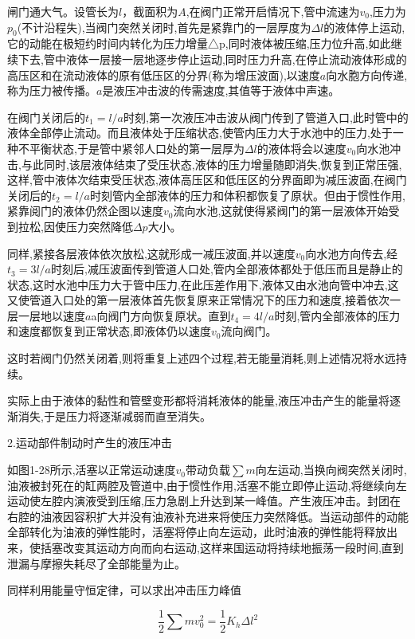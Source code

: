 

闸门通大气。设管长为$l$，截面积为$A$,在阀门正常开启情况下,管中流速为$v_0$,压力为$p_0$(不计沿程失),当阀门突然关闭时,首先是紧靠门的一层厚度为$\varDelta l$的液体停上运动,它的动能在极短约时间内转化为压力增量△p,同时液体被压缩,压力位升高,如此继续下去,管中液体一层接一层地逐步停止运动,同时压力升高,在停止流动液体形成的高压区和在流动液体的原有低压区的分界(称为增压波面),以速度$a$向水胞方向传递,称为压力被传播。$a$是液压冲击波的传需速度,其值等于液体中声速。

在阀门关闭后的$t_1=l/a$时刻,第一次液压冲击波从阀门传到了管道入口,此时管中的液体全部停止流动。而且液体处于压缩状态,使管内压力大于水池中的压力,处于一种不平衡状态,于是管中紧邻人口处的第一层厚为$\varDelta l$的液体将会以速度$v_0$向水池冲击,与此同时,该层液体结束了受压状态,液体的压力增量随即消失,恢复到正常压强,这样,管中液体次结束受压状态,液体高压区和低压区的分界面即为减压波面,在阀门关闭后的$t_2=l/a$时刻管内全部液体的压力和体积都恢复了原状。但由于惯性作用,紧靠阅门的液体仍然企图以速度$v_0$流向水池,这就使得紧阀门的第一层液体开始受到拉松,因使压力突然降低$\varDelta p$大小。

同样,紧接各层液体依次放松,这就形成一减压波面,并以速度$v_0$向水池方向传去,经$t_3=3l/a$时刻后,减压波面传到管道人口处,管内全部液体都处于低压而且是静止的状态,这时水池中压力大于管中压力,在此压差作用下,液体又由水池向管中冲去,这又使管道入口处的第一层液体首先恢复原来正常情况下的压力和速度,接着依次一层一层地以速度$a$a向阀门方向恢复原状。直到$t_4=4l/a$时刻,管内全部液体的压力和速度都恢复到正常状态,即液体仍以速度$v_0$流向阀门。

这时若阀门仍然关闭着,则将重复上述四个过程,若无能量消耗,则上述情况将水远持续。

实际上由于液体的黏性和管壁变形都将消耗液体的能量,液压冲击产生的能量将逐渐消失,于是压力将逐渐减弱而直至消失。

2.运动部件制动时产生的液压冲击

如图1-28所示,活塞以正常运动速度$v_0$带动负载$\sum{m}$向左运动,当换向阀突然关闭时,油液被封死在的缸两腔及管道中,由于惯性作用,活塞不能立即停止运动,将继续向左运动使左腔内演液受到压缩,压力急剧上升达到某一峰值。产生液压冲击。封团在右腔的油液因容积扩大并没有油液补充进来将使压力突然降低。当运动部件的动能全部转化为油液的弹性能时，活塞将停止向左运动，此时油液的弹性能将释放出来，使括塞改变其运动方向而向右运动,这样来国运动将持续地振荡一段时间,直到泄漏与摩擦失耗尽了全部能量为止。

同样利用能量守恒定律，可以求出冲击压力峰值

$$
\frac{1}{2}\sum{mv_{0}^{2}=\frac{1}{2}K_h\varDelta l^2}
$$

